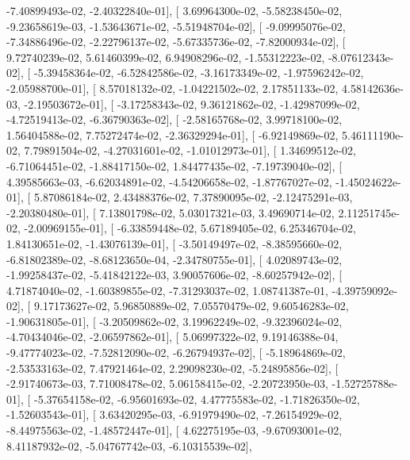 \documentclass{article}
\begin{document}
         -7.40899493e-02,  -2.40322840e-01],
       [  3.69964300e-02,  -5.58238450e-02,  -9.23658619e-03,
         -1.53643671e-02,  -5.51948704e-02],
       [ -9.09995076e-02,  -7.34886496e-02,  -2.22796137e-02,
         -5.67335736e-02,  -7.82000934e-02],
       [  9.72740239e-02,   5.61460399e-02,   6.94908296e-02,
         -1.55312223e-02,  -8.07612343e-02],
       [ -5.39458364e-02,  -6.52842586e-02,  -3.16173349e-02,
         -1.97596242e-02,  -2.05988700e-01],
       [  8.57018132e-02,  -1.04221502e-02,   2.17851133e-02,
          4.58142636e-03,  -2.19503672e-01],
       [ -3.17258343e-02,   9.36121862e-02,  -1.42987099e-02,
         -4.72519413e-02,  -6.36790363e-02],
       [ -2.58165768e-02,   3.99718100e-02,   1.56404588e-02,
          7.75272474e-02,  -2.36329294e-01],
       [ -6.92149869e-02,   5.46111190e-02,   7.79891504e-02,
         -4.27031601e-02,  -1.01012973e-01],
       [  1.34699512e-02,  -6.71064451e-02,  -1.88417150e-02,
          1.84477435e-02,  -7.19739040e-02],
       [  4.39585663e-03,  -6.62034891e-02,  -4.54206658e-02,
         -1.87767027e-02,  -1.45024622e-01],
       [  5.87086184e-02,   2.43488376e-02,   7.37890095e-02,
         -2.12475291e-03,  -2.20380480e-01],
       [  7.13801798e-02,   5.03017321e-03,   3.49690714e-02,
          2.11251745e-02,  -2.00969155e-01],
       [ -6.33859448e-02,   5.67189405e-02,   6.25346704e-02,
          1.84130651e-02,  -1.43076139e-01],
       [ -3.50149497e-02,  -8.38595660e-02,  -6.81802389e-02,
         -8.68123650e-04,  -2.34780755e-01],
       [  4.02089743e-02,  -1.99258437e-02,  -5.41842122e-03,
          3.90057606e-02,  -8.60257942e-02],
       [  4.71874040e-02,  -1.60389855e-02,  -7.31293037e-02,
          1.08741387e-01,  -4.39759092e-02],
       [  9.17173627e-02,   5.96850889e-02,   7.05570479e-02,
          9.60546283e-02,  -1.90631805e-01],
       [ -3.20509862e-02,   3.19962249e-02,  -9.32396024e-02,
         -4.70434046e-02,  -2.06597862e-01],
       [  5.06997322e-02,   9.19146388e-04,  -9.47774023e-02,
         -7.52812090e-02,  -6.26794937e-02],
       [ -5.18964869e-02,  -2.53533163e-02,   7.47921464e-02,
          2.29098230e-02,  -5.24895856e-02],
       [ -2.91740673e-03,   7.71008478e-02,   5.06158415e-02,
         -2.20723950e-03,  -1.52725788e-01],
       [ -5.37654158e-02,  -6.95601693e-02,   4.47775583e-02,
         -1.71826350e-02,  -1.52603543e-01],
       [  3.63420295e-03,  -6.91979490e-02,  -7.26154929e-02,
         -8.44975563e-02,  -1.48572447e-01],
       [  4.62275195e-03,  -9.67093001e-02,   8.41187932e-02,
         -5.04767742e-03,  -6.10315539e-02],
\end{document}
